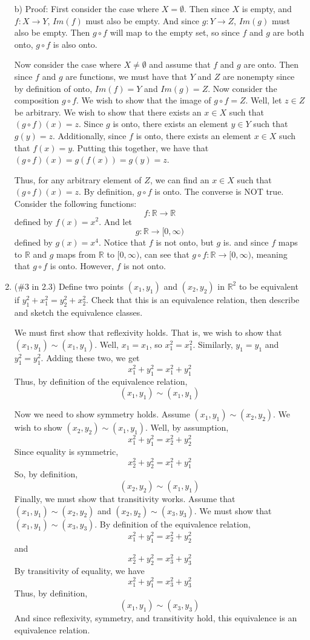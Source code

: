 \documentclass{article}
\begin{document}
\begin{enumerate}
b) Proof: First consider the case where $X = \emptyset$. Then since $X$ is empty, and $f: X \to Y$, $Im(f)$ must also be empty. And since $g: Y \to Z$, $Im(g)$ must also be empty. Then $g \circ f$ will map to the empty set, so since $f$ and $g$ are both onto, $g \circ f$ is also onto.
\newline



Now consider the case where $X \neq \emptyset$ and assume that $f$ and $g$ are onto. Then since $f$ and $g$ are functions, we must have that $Y$ and $Z$ are nonempty since by definition of onto, $Im(f) = Y$ and $Im(g) = Z$. Now consider the composition $g \circ f$. We wish to show that the image of $g \circ f = Z$. Well, let $z \in Z$ be arbitrary. We wish to show that there exists an $x \in X$ such that $(g \circ f)(x) = z$. Since $g$ is onto, there exists an element $y \in Y$ such that $g(y) = z$. Additionally, since $f$ is onto, there exists an element $x \in X$ such that $f(x) = y$. Putting this together, we have that $(g \circ f)(x) = g(f(x)) = g(y) = z$.

Thus, for any arbitrary element of $Z$, we can find an $x \in X$ such that $(g \circ f)(x) = z$. By definition, $g \circ f$ is onto.
\newline
The converse is NOT true. Consider the following functions:
\[f: \mathbb{R} \to \mathbb{R}\]
defined by $f(x) = x^2$. And let 
\[g: \mathbb{R} \to [0, \infty)\]
defined by $g(x) = x^4$. Notice that $f$ is not onto, but $g$ is. and since $f$ maps to $\mathbb{R}$ and $g$ maps from $\mathbb{R}$ to $[0, \infty)$, can see that $g \circ f: \mathbb{R} \to [0,\infty)$, meaning that $g \circ f$ is onto. However, $f$ is not onto.

\item{}
(\#3 in 2.3) Define two points $(x_1,y_1)$ and $(x_2,y_2)$ in $\mathbb{R}^2$ to be equivalent if $y_1^2+x_1^2=y_2^2+x_2^2$. Check that this is an equivalence relation, then describe and sketch the equivalence classes.
\newline

We must first show that reflexivity holds. That is, we wish to show that $(x_1,y_1) \sim (x_1, y_1)$. Well, $x_1 = x_1$, so $x_1^2 = x_1^2$. Similarly, $y_1 = y_1$ and $y_1^2 = y_1^2$. Adding these two, we get
\[x_1^2 + y_1^2 = x_1^2 + y_1^2\]
Thus, by definition of the equivalence relation,
\[(x_1, y_1) \sim (x_1, y_1)\]

Now we need to show symmetry holds. 
Assume $(x_1, y_1) \sim (x_2, y_2)$. We wish to show $(x_2, y_2) \sim (x_1, y_1)$.
Well, by assumption, 
\[x_1^2 + y_1^2 = x_2^2 + y_2^2\]
Since equality is symmetric,
\[x_2^2 + y_2^2 = x_1^2 + y_1^2\]
So, by definition,
\[(x_2, y_2) \sim (x_1, y_1)\]
Finally, we must show that transitivity works. Assume that $(x_1, y_1) \sim (x_2, y_2)$ and $(x_2, y_2) \sim (x_3, y_3)$. We must show that $(x_1, y_1) \sim (x_3, y_3)$.
By definition of the equivalence relation,
\[x_1^2 + y_1^2 = x_2^2 + y_2^2\]
and
\[x_2^2 + y_2^2 = x_3^2 + y_3^2\]
By transitivity of equality, we have
\[x_1^2 + y_1^2 = x_3^2 + y_3^2\]
Thus, by definition, 
\[(x_1, y_1) \sim (x_3, y_3)\]
And since reflexivity, symmetry, and transitivity hold, this equivalence is an equivalence relation.


\end{enumerate}
\end{document}
